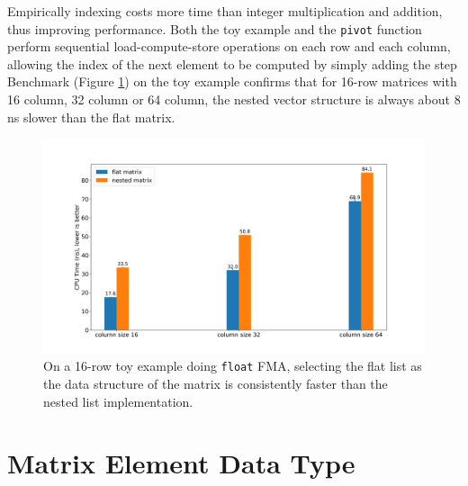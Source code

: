 \documentclass[logo,bsc,singlespacing,parskip]{infthesis}
\newcommand{\dtfloat}{\texttt{float}}
\newcommand{\pivot}{\texttt{pivot}}
\begin{document}
Empirically indexing costs more time than integer multiplication and addition,
thus improving performance. Both the toy example and the \pivot{} function
perform sequential load-compute-store operations on each row and each column,
allowing the index of the next element to be computed by simply adding the step
Benchmark (Figure \ref{fig:nested-flat}) on the toy example confirms that for
16-row matrices with 16 column, 32 column or 64 column, the nested vector structure
is always about 8 ns slower than the flat matrix.

\begin{figure}
    \includegraphics[width=\linewidth]{image/bench_nested_flat.png}
\caption{On a 16-row toy example doing \dtfloat{} FMA, selecting
the flat list as the data structure of the matrix is consistently faster than the
nested list implementation.  }
    \label{fig:nested-flat}
\end{figure}


\section{Matrix Element Data Type}
\end{document}
